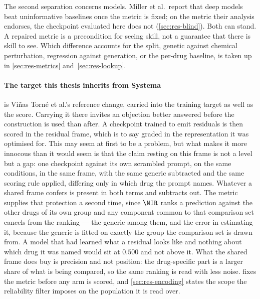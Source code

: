 The second separation concerns models. Miller et al.\ report that deep models
beat uninformative baselines once the metric is fixed; on the metric their
analysis endorses, the checkpoint evaluated here does not
(\cref{sec:res-blind}). Both can stand. A repaired metric is a precondition for
seeing skill, not a guarantee that there is skill to see. Which difference
accounts for the split, genetic against chemical perturbation, regression against
generation, or the per-drug baseline, is taken up in \cref{sec:res-metrics}
and~\cref{sec:res-lookup}.

\paragraph{The target this thesis inherits from Systema} 

 is Vi\~nas Torn\'e et al.'s reference change, carried
into the training target as well as the score. Carrying it there invites an objection better answered before the construction is
used than after. A checkpoint trained to emit residuals is then scored in the
residual frame, which is to say graded in the representation it was optimised
for. This may seem at first to be a problem, but what makes it more innocous than it would seem is that the claim resting on this frame is not a
level but a gap: one checkpoint against its own scrambled prompt, on the same
conditions, in the same frame, with the same generic subtracted and the same
scoring rule applied, differing only in which drug the prompt names. Whatever a
shared frame confers is present in both terms and subtracts out. The metric
supplies that protection a second time, since $\NIR$ ranks a prediction against
the other drugs of its own group and any component common to that comparison set
cancels from the ranking --- the generic among them, and the error in estimating
it, because the generic is fitted on exactly the group the comparison set is
drawn from. A model that had learned what a residual looks like and nothing about
which drug it was named would sit at $0.500$ and not above it. What the shared
frame does buy is precision and not position: the drug-specific part is a larger
share of what is being compared, so the same ranking is read with less noise.
 fixes the metric before any arm is scored, and
\cref{sec:res-encoding} states the scope the reliability filter imposes on the
population it is read over.


